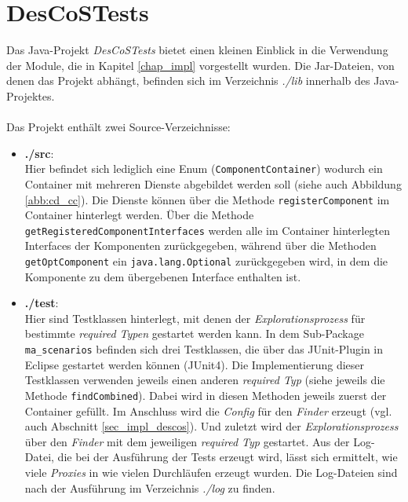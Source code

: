 \chapter{DesCoSTests}\label{app_test}
Das Java-Projekt \emph{DesCoSTests} bietet einen kleinen Einblick in die Verwendung der Module, die in Kapitel \ref{chap_impl} vorgestellt wurden. Die Jar-Dateien, von denen das Projekt abhängt, befinden sich im Verzeichnis \emph{./lib} innerhalb des Java-Projektes.
\\\\
Das Projekt enthält zwei Source-Verzeichnisse:
\begin{itemize}
\item \textbf{./src}: \\
Hier befindet sich lediglich eine Enum (\texttt{ComponentContainer}) wodurch ein Container mit mehreren Dienste abgebildet werden soll (siehe auch Abbildung \ref{abb:cd_cc}). Die Dienste können über die Methode \texttt{registerComponent} im Container hinterlegt werden. Über die Methode \texttt{getRegisteredComponentInterfaces} werden alle im Container hinterlegten Interfaces der Komponenten zurückgegeben, während über die Methoden \texttt{getOptComponent} ein \texttt{java.lang.Optional} zurückgegeben wird, in dem die Komponente zu dem übergebenen Interface enthalten ist.

\item \textbf{./test}:\\
Hier sind Testklassen hinterlegt, mit denen der \emph{Explorationsprozess} für bestimmte \emph{required Typen} gestartet werden kann. In dem Sub-Package \texttt{ma\_scenarios} befinden sich drei Testklassen, die über das JUnit-Plugin in Eclipse gestartet werden können (JUnit4). Die Implementierung dieser Testklassen verwenden jeweils einen anderen \emph{required Typ} (siehe jeweils die Methode \texttt{findCombined}). Dabei wird in diesen Methoden jeweils zuerst der Container gefüllt. Im Anschluss wird die \emph{Config} für den \emph{Finder} erzeugt (vgl. auch Abschnitt \ref{sec_impl_descos}). Und zuletzt wird der \emph{Explorationsprozess} über den \emph{Finder} mit dem jeweiligen \emph{required Typ} gestartet. Aus der Log-Datei, die bei der Ausführung der Tests erzeugt wird, lässt sich ermittelt, wie viele \emph{Proxies} in wie vielen Durchläufen erzeugt wurden. Die Log-Dateien sind nach der Ausführung im Verzeichnis \emph{./log} zu finden.
\end{itemize}
